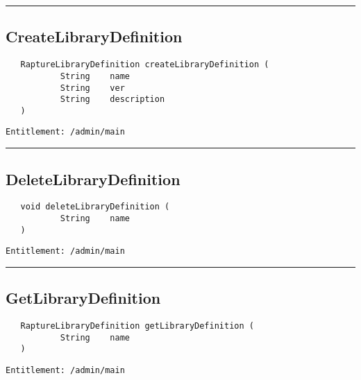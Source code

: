 \rule{12cm}{2pt}
\subsection{CreateLibraryDefinition}
\label{Api:CreateLibraryDefinition}
\begin{Verbatim}
   RaptureLibraryDefinition createLibraryDefinition (
           String    name
           String    ver
           String    description
   )
\end{Verbatim}
\begin{Verbatim}[formatcom=\color{Maroon}]
  Entitlement: /admin/main
\end{Verbatim}



\rule{12cm}{2pt}
\subsection{DeleteLibraryDefinition}
\label{Api:DeleteLibraryDefinition}
\begin{Verbatim}
   void deleteLibraryDefinition (
           String    name
   )
\end{Verbatim}
\begin{Verbatim}[formatcom=\color{Maroon}]
  Entitlement: /admin/main
\end{Verbatim}



\rule{12cm}{2pt}
\subsection{GetLibraryDefinition}
\label{Api:GetLibraryDefinition}
\begin{Verbatim}
   RaptureLibraryDefinition getLibraryDefinition (
           String    name
   )
\end{Verbatim}
\begin{Verbatim}[formatcom=\color{Maroon}]
  Entitlement: /admin/main
\end{Verbatim}



